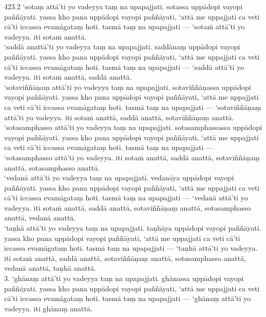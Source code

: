 \documentclass[10pt]{article}
\begin{document}
423.2 ‘sotaṃ attā’ti yo vadeyya taṃ na upapajjati. sotassa uppādopi vayopi paññāyati. yassa kho pana uppādopi vayopi paññāyati, ‘attā me uppajjati ca veti cā’ti iccassa evamāgataṃ hoti. tasmā taṃ na upapajjati — ‘sotaṁ attā’ti yo vadeyya. iti sotaṁ anattā.\\

‘saddā anattā’ti yo vadeyya taṃ na upapajjati. saddānaṃ uppādopi vayopi paññāyati. yassa kho pana uppādopi vayopi paññāyati, ‘attā me uppajjati ca veti cā’ti iccassa evamāgataṃ hoti. tasmā taṃ na upapajjati — ‘saddā attā’ti yo vadeyya. iti sotaṁ anattā, saddā anattā.\\

‘sotaviññāṇaṃ attā’ti yo vadeyya taṃ na upapajjati. sotaviññāṇassa uppādopi vayopi paññāyati. yassa kho pana uppādopi vayopi paññāyati, ‘attā me uppajjati ca veti cā’ti iccassa evamāgataṃ hoti. tasmā taṃ na upapajjati — ‘sotaviññāṇaṃ attā’ti yo vadeyya. iti sotaṁ anattā, saddā anattā, sotaviññāṇaṃ anattā.\\

‘sotasamphasso attā’ti yo vadeyya taṃ na upapajjati. sotasamphassassa uppādopi vayopi paññāyati. yassa kho pana uppādopi vayopi paññāyati, ‘attā me uppajjati ca veti cā’ti iccassa evamāgataṃ hoti. tasmā taṃ na upapajjati — ‘sotasamphasso attā’ti yo vadeyya. iti sotaṁ anattā, saddā anattā, sotaviññāṇaṃ anattā, sotasamphasso anattā.\\

‘vedanā attā’ti yo vadeyya taṃ na upapajjati. vedanāya uppādopi vayopi paññāyati. yassa kho pana uppādopi vayopi paññāyati, ‘attā me uppajjati ca veti cā’ti iccassa evamāgataṃ hoti. tasmā taṃ na upapajjati — ‘vedanā attā’ti yo vadeyya. iti sotaṁ anattā, saddā anattā, sotaviññāṇaṃ anattā, sotasamphasso anattā, vedanā anattā.\\

‘taṇhā attā’ti yo vadeyya taṃ na upapajjati. taṇhāya uppādopi vayopi paññāyati. yassa kho pana uppādopi vayopi paññāyati, ‘attā me uppajjati ca veti cā’ti iccassa evamāgataṃ hoti. tasmā taṃ na upapajjati — ‘taṇhā attā’ti yo vadeyya. iti sotaṁ anattā, saddā anattā, sotaviññāṇaṃ anattā, sotasamphasso anattā, vedanā anattā, taṇhā anattā.\\

3. ‘ghānaṃ attā’ti yo vadeyya taṃ na upapajjati. ghānassa uppādopi vayopi paññāyati. yassa kho pana uppādopi vayopi paññāyati, ‘attā me uppajjati ca veti cā’ti iccassa evamāgataṃ hoti. tasmā taṃ na upapajjati — ‘ghānaṃ attā’ti yo vadeyya. iti ghānaṃ anattā.\\
\end{document}

